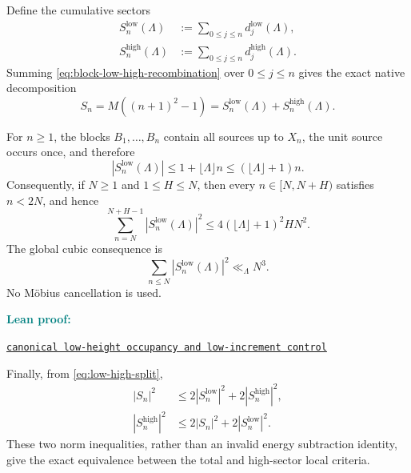 \documentclass[11pt]{article}
\theoremstyle{definition}
\newcommand{\1}{\mathbf{1}}
\newcommand{\leanxref}[3]{%
  \par\smallskip
  {\small\noindent\textcolor{teal}{\textbf{#1:}}\par
  \noindent\href{#3}{\nolinkurl{#2}}\par}
  \smallskip
}
\begin{document}
Define the cumulative sectors
\begin{align}
 S_n^{\mathrm{low}}(\Lambda)
 &:={}
 \sum_{0\le j\le n}d_j^{\mathrm{low}}(\Lambda),
 \label{eq:low-prefix}\\
 S_n^{\mathrm{high}}(\Lambda)
 &:={}
 \sum_{0\le j\le n}d_j^{\mathrm{high}}(\Lambda).
 \label{eq:high-prefix}
\end{align}
Summing \cref{eq:block-low-high-recombination} over $0\le j\le n$ gives the exact native decomposition
\begin{equation}
 \boxed{
 S_n=M((n+1)^2-1)
 =S_n^{\mathrm{low}}(\Lambda)+S_n^{\mathrm{high}}(\Lambda).
 }
 \label{eq:low-high-split}
\end{equation}

For $n\ge1$, the blocks $B_1,\ldots,B_n$ contain all sources up to $X_n$, the unit source occurs once, and therefore
\begin{equation}
 |S_n^{\mathrm{low}}(\Lambda)|
 \le1+\lfloor\Lambda\rfloor n
 \le(\lfloor\Lambda\rfloor+1)n.
 \label{eq:low-prefix-bound}
\end{equation}
Consequently, if $N\ge1$ and $1\le H\le N$, then every $n\in[N,N+H)$ satisfies $n<2N$, and hence
\begin{equation}
 \boxed{
 \sum_{n=N}^{N+H-1}
 |S_n^{\mathrm{low}}(\Lambda)|^2
 \le
 4(\lfloor\Lambda\rfloor+1)^2HN^2.
 }
 \label{eq:low-local-bound}
\end{equation}
The global cubic consequence is
\begin{equation}
 \sum_{n\le N}|S_n^{\mathrm{low}}(\Lambda)|^2
 \ll_{\Lambda}N^3.
 \label{eq:low-cubic}
\end{equation}
No M\"obius cancellation is used.
\leanxref{Lean proof}{canonical low-height occupancy and low-increment control}{https://github.com/OVVO-Financial/square-block-mobius/blob/main/lean/RHLean/Analysis/CanonicalLowOccupancy.lean}

Finally, from \cref{eq:low-high-split},
\begin{align}
 |S_n|^2
 &\le2|S_n^{\mathrm{low}}|^2+2|S_n^{\mathrm{high}}|^2,
 \label{eq:total-from-low-high}\\
 |S_n^{\mathrm{high}}|^2
 &\le2|S_n|^2+2|S_n^{\mathrm{low}}|^2.
 \label{eq:high-from-total-low}
\end{align}
These two norm inequalities, rather than an invalid energy subtraction identity, give the exact equivalence between the total and high-sector local criteria.

\end{document}
